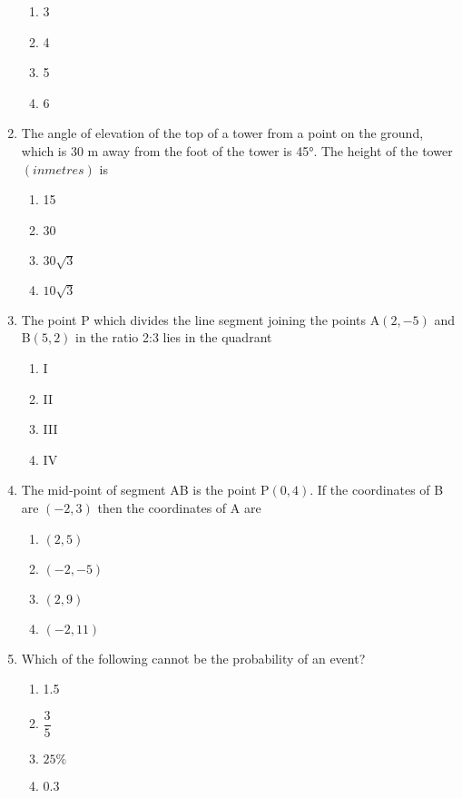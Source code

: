 \documentclass[12pt,-letter paper]{article}
\providecommand{\brak}[1]{\ensuremath{\left(#1\right)}}
\theoremstyle{remark}
\begin{document}
\begin{enumerate}
\begin{enumerate}
        \item 3
        \item 4 
        \item 5
        \item 6
    \end{enumerate}
    \item The angle of elevation of the top of a tower from a point on the ground, which is 30 m away from the foot of the tower is 45°. The height of the tower $\brak{in metres}$ is
    \begin{enumerate}
        \item 15
        \item 30 
        \item $30\sqrt{3}$
        \item $10\sqrt{3}$
    \end{enumerate}
    \item The point P which divides the line segment joining the points A$\brak{2, -5}$ and B$\brak{5, 2}$ in the ratio 2:3 lies in the quadrant
    \begin{enumerate}
        \item I
        \item II 
        \item III
        \item IV
    \end{enumerate}
    \item The mid-point of segment AB is the point P$\brak{0,4}$. If the coordinates of B are $\brak{-2, 3}$ then the coordinates of A are
    \begin{enumerate}
        \item $\brak{2,5}$
        \item $\brak{-2,-5}$
        \item $\brak{2,9}$
        \item $\brak{-2,11}$
    \end{enumerate}
    \item Which of the following cannot be the probability of an event?
    \begin{enumerate}
        \item 1.5
        \item $\dfrac{3}{5}$
        \item $25\%$
        \item 0.3
    \end{enumerate}\newpage
    

\end{enumerate}
\end{document}
